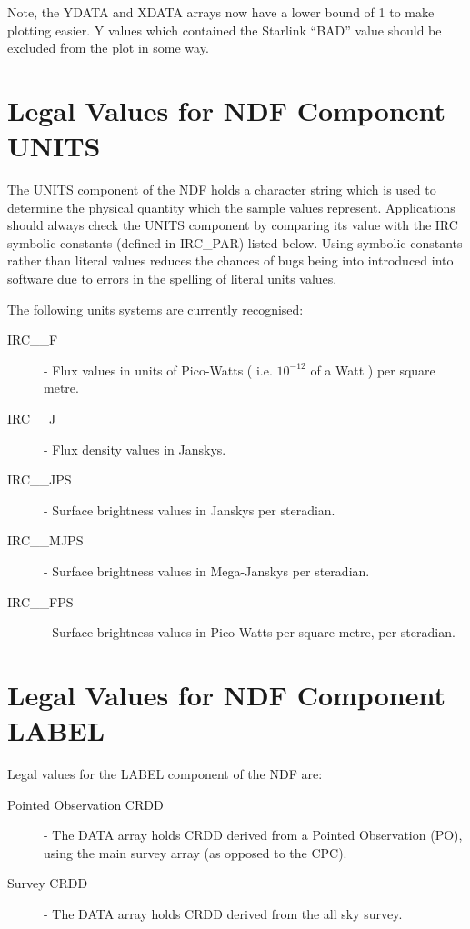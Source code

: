 \begin{enumerate}
\begin{quote}
\begin{tabbing}
\end{tabbing}
\end{quote}

Note, the YDATA and XDATA arrays now have a lower bound of 1 to make plotting
easier. Y values which contained the Starlink ``BAD'' value should be excluded
from the plot in some way.

\end{enumerate}
\section {Legal Values for NDF Component UNITS}
\label{APP:UNITS}
The UNITS component of the NDF holds a character string which is used to
determine the physical quantity which the sample values represent. Applications
should always check the UNITS component by comparing its value with the
IRC symbolic constants (defined in IRC\_PAR) listed below. Using symbolic
constants rather than literal values reduces the chances of bugs being into
introduced into software due to errors in the spelling of literal units values.

The following units systems are currently recognised:
\begin{description}
\item [IRC\_\_F] - Flux values in units of Pico-Watts ( i.e. $10^{-12}$ of a
Watt ) per square metre.
\item [IRC\_\_J] - Flux density values in Janskys.
\item [IRC\_\_JPS] - Surface brightness values in Janskys per steradian.
\item [IRC\_\_MJPS] - Surface brightness values in Mega-Janskys per steradian.
\item [IRC\_\_FPS] - Surface brightness values in Pico-Watts per square metre,
per steradian.
\end{description}

\section {Legal Values for NDF Component LABEL}
\label{APP:LABEL}
Legal values for the LABEL component of the NDF are:
\begin{description}
\item [Pointed Observation CRDD] - The DATA array holds CRDD derived
from a Pointed Observation (PO), using the main survey array (as opposed to the
CPC).
\item [Survey CRDD] - The DATA array holds CRDD derived from the all sky survey.
\end{description}

